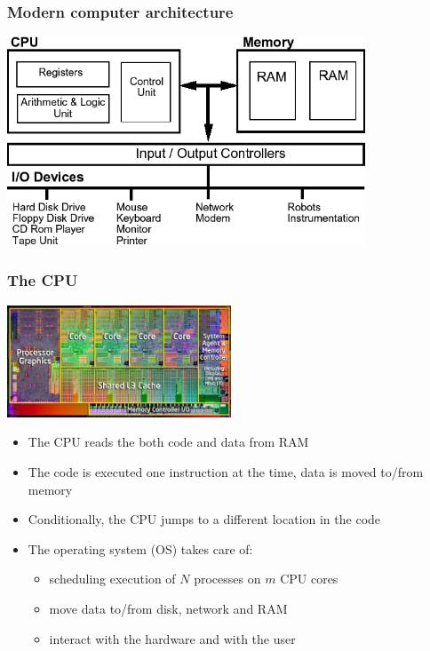 \documentclass{beamer}
\begin{document}
\begin{frame}[fragile]
  \frametitle{Modern computer architecture}
  \begin{center}
  \includegraphics[width=0.8\textwidth]{computer_architecture.png}
  \end{center}
\end{frame}

\begin{frame}[fragile]
  \frametitle{The CPU}
  \begin{center}
  \includegraphics[width=0.5\textwidth]{insideintel.jpg}
  \end{center}
  \begin{itemize}
  \item The CPU reads the both code and data from RAM
  \item The code is executed one instruction at the time, data is
        moved to/from memory
  \item Conditionally, the CPU jumps to a different location in the code\pause
  \item The operating system (OS) takes care of:
        \begin{itemize} 
        \item scheduling execution of $N$ processes on $m$ CPU cores
        \item move data to/from disk, network and RAM
        \item interact with the hardware and with the user
        \end{itemize}
  \end{itemize} 
\end{frame}
\end{document}
